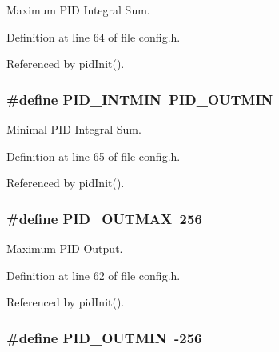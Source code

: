 Maximum P\-I\-D Integral Sum. 



Definition at line 64 of file config.\-h.



Referenced by pid\-Init().

\hypertarget{group__config_ga9ee651f30455f25b5ca4c4bb9a0a6e49}{
\subsubsection[{P\-I\-D\-\_\-\-I\-N\-T\-M\-I\-N}]{\setlength{\rightskip}{0pt plus 5cm}\#define P\-I\-D\-\_\-\-I\-N\-T\-M\-I\-N~{\bf P\-I\-D\-\_\-\-O\-U\-T\-M\-I\-N}}}\label{group__config_ga9ee651f30455f25b5ca4c4bb9a0a6e49}


Minimal P\-I\-D Integral Sum. 



Definition at line 65 of file config.\-h.



Referenced by pid\-Init().

\hypertarget{group__config_gaf36e4eab421932a006c7df7e84f11cf0}{
\subsubsection[{P\-I\-D\-\_\-\-O\-U\-T\-M\-A\-X}]{\setlength{\rightskip}{0pt plus 5cm}\#define P\-I\-D\-\_\-\-O\-U\-T\-M\-A\-X~256}}\label{group__config_gaf36e4eab421932a006c7df7e84f11cf0}


Maximum P\-I\-D Output. 



Definition at line 62 of file config.\-h.



Referenced by pid\-Init().

\hypertarget{group__config_ga684067981e82e4827607d0b0558812cb}{
\subsubsection[{P\-I\-D\-\_\-\-O\-U\-T\-M\-I\-N}]{\setlength{\rightskip}{0pt plus 5cm}\#define P\-I\-D\-\_\-\-O\-U\-T\-M\-I\-N~-\/256}}\label{group__config_ga684067981e82e4827607d0b0558812cb}


